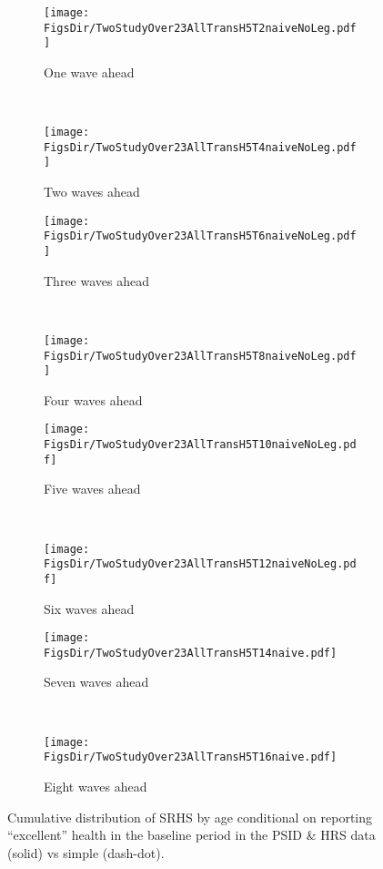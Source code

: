 \documentclass[12pt,pdftex,letterpaper]{article}
\newcommand{\RootDir}{..}
\newcommand{\FigsDir}{\RootDir/Figures}
\begin{document}
\begin{figure}
	\centering
	\begin{subfigure}[b]{0.48\textwidth}
		\texttt{[image: \\FigsDir/TwoStudyOver23AllTransH5T2naiveNoLeg.pdf]}
		\caption{One wave ahead}\label{fig:Naive1AheadExcellent}
	\end{subfigure}
	~
	\begin{subfigure}[b]{0.48\textwidth}
		\texttt{[image: \\FigsDir/TwoStudyOver23AllTransH5T4naiveNoLeg.pdf]}
		\caption{Two waves ahead}\label{fig:Naive2AheadExcellent}
	\end{subfigure}
	
	\begin{subfigure}[b]{0.48\textwidth}
		\texttt{[image: \\FigsDir/TwoStudyOver23AllTransH5T6naiveNoLeg.pdf]}
		\caption{Three waves ahead}\label{fig:Naive3AheadExcellent}
	\end{subfigure}
	~
	\begin{subfigure}[b]{0.48\textwidth}
		\texttt{[image: \\FigsDir/TwoStudyOver23AllTransH5T8naiveNoLeg.pdf]}
		\caption{Four waves ahead}\label{fig:Naive4AheadExcellent}
	\end{subfigure}
	
	\begin{subfigure}[b]{0.48\textwidth}
		\texttt{[image: \\FigsDir/TwoStudyOver23AllTransH5T10naiveNoLeg.pdf]}
		\caption{Five waves ahead}\label{fig:Naive5AheadExcellent}
	\end{subfigure}
	~
	\begin{subfigure}[b]{0.48\textwidth}
		\texttt{[image: \\FigsDir/TwoStudyOver23AllTransH5T12naiveNoLeg.pdf]}
		\caption{Six waves ahead}\label{fig:Naive6AheadExcellent}
	\end{subfigure}
	
	\begin{subfigure}[b]{0.48\textwidth}
		\texttt{[image: \\FigsDir/TwoStudyOver23AllTransH5T14naive.pdf]}
		\caption{Seven waves ahead}\label{fig:Naive7AheadExcellent}
	\end{subfigure}
	~
	\begin{subfigure}[b]{0.48\textwidth}
		\texttt{[image: \\FigsDir/TwoStudyOver23AllTransH5T16naive.pdf]}
		\caption{Eight waves ahead}\label{fig:Naive8AheadExcellent}
	\end{subfigure}
	\caption{Cumulative distribution of SRHS by age conditional on reporting ``excellent'' health in the baseline period in the PSID \& HRS data (solid) vs simple (dash-dot).}\label{fig:NaiveTransEX}
\end{figure}
\end{document}
